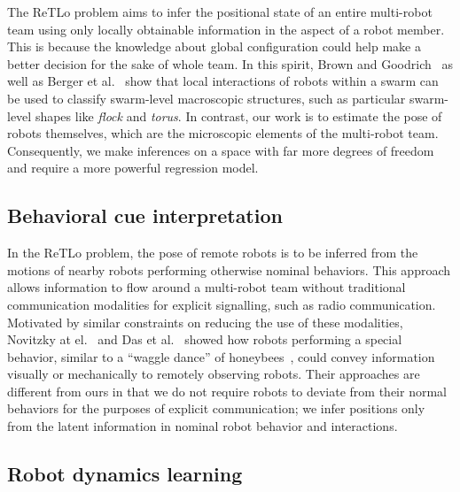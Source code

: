 \documentclass[letterpaper, 10 pt, conference]{ieeeconf}  %
\begin{document}
    The ReTLo problem aims to infer the positional state of an entire
    multi-robot team using only locally obtainable information in the
    aspect of a robot member. This is because the knowledge about global
    configuration could help make a better decision for the sake of
    whole team. In this spirit, Brown and Goodrich~\cite{BG14} as well
    as Berger et al.~\cite{BSB16} show that local interactions of robots
    within a swarm can be used to classify swarm-level macroscopic
    structures, such as particular swarm-level shapes like \emph{flock}
    and \emph{torus}. In contrast, our work is to estimate the pose of
    robots themselves, which are the microscopic elements of the
    multi-robot team. Consequently, we make inferences on a space with
    far more degrees of freedom and require a more powerful regression
    model.

	\subsection{Behavioral cue interpretation}
	\label{sec:behavioral_cue_interpretation}

    In the ReTLo problem, the pose of remote robots is to be inferred from
    the motions of nearby robots performing otherwise nominal behaviors.
    This approach allows information to flow around a multi-robot team
    without traditional communication modalities for explicit
    signalling, such as radio communication. Motivated by similar
    constraints on reducing the use of these modalities, Novitzky at
    el.~\cite{NPCBW12} and Das et al.~\cite{DCV16} showed how robots
    performing a special behavior, similar to a ``waggle dance'' of
    honeybees~\cite{VonFrisch67}, could convey information visually or
    mechanically to remotely observing robots. Their approaches are
    different from ours in that we do not require robots to deviate from
    their normal behaviors for the purposes of explicit communication;
    we infer positions only from the latent information in nominal robot
    behavior and interactions.

	\subsection{Robot dynamics learning}
	\label{sec:robot_dynamics_learning}
\end{document}
